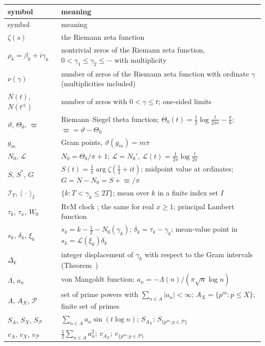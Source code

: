 \documentclass[preprint,12pt]{elsarticle}
\makeatletter
\let\CG@origref\ref
\let\CG@origeqref\eqref
\newcommand{\CG@gettip}[1]{\@ifundefined{CGTip@#1}{Reference: #1}{\csname CGTip@#1\endcsname}}
\DeclareRobustCommand{\CGref}[1]{\pdftooltip{\CG@origref{#1}}{\CG@gettip{#1}}}
\DeclareRobustCommand{\CGeqref}[1]{\pdftooltip{\CG@origeqref{#1}}{\CG@gettip{#1}}}
\numberwithin{equation}{section}
\theoremstyle{plain}
\theoremstyle{definition}
\theoremstyle{remark}
\newcommand{\NO}{N_0}
\newcommand{\lL}{\mathcal L}
\newcommand{\IT}{\mathcal I_T}
\newcommand{\PP}{\mathcal P}
\makeatother
\begin{document}
\begin{center}
\small
\begin{longtable}{p{}p{}}
\toprule
symbol & meaning\\
\midrule
\endfirsthead
\toprule
symbol & meaning\\
\midrule
\endhead
\bottomrule
\endfoot
$\zeta(s)$ & the Riemann zeta function\\
$\rho_k=\beta_k+i\gamma_k$ & nontrivial zeros of the Riemann zeta function, $0<\gamma_1\le\gamma_2\le\cdots$ with multiplicity\\
$\nu(\gamma)$ & number of zeros of the Riemann zeta function with ordinate $\gamma$ (multiplicities included)\\
$N(t)$, $N(t^\pm)$ & number of zeros with $0<\gamma\le t$; one-sided limits\\
$\vartheta$, $\Theta_0$, $\varpi$ & Riemann--Siegel theta function; $\Theta_0(t)=\frac t2\log\frac t{2\pi e}-\frac\pi8$; $\varpi=\vartheta-\Theta_0$\\
$g_m$ & Gram points, $\vartheta(g_m)=m\pi$\\
$\NO$, $\lL$ & $\NO=\Theta_0/\pi+1$; $\lL=\NO'$, $\lL(t)=\frac1{2\pi}\log\frac t{2\pi}$\\
$S$, $S^*$, $G$ & $S(t)=\frac1\pi\arg\zeta(\frac12+it)$; midpoint value at ordinates; $G=N-\NO=S+\varpi/\pi$\\
$\IT$, $\langle\,\cdot\,\rangle_I$ & $\{k:T<\gamma_k\le2T\}$; mean over $k$ in a finite index set $I$\\
$\tau_k$, $\tau_x$, $W_0$ & RvM clock \CGeqref{eq:clock}; the same for real $x\ge1$; principal Lambert function\\
$s_k$, $\delta_k$, $\xi_k$ & $s_k=k-\frac12-\NO(\gamma_k)$; $\delta_k=\tau_k-\gamma_k$; mean-value point in $s_k=\lL(\xi_k)\delta_k$\\
$\Delta_k$ & integer displacement of $\gamma_k$ with respect to the Gram intervals (Theorem~\CGref{thm:known_korolev})\\
$\Lambda$, $a_n$ & von Mangoldt function; $a_n=-\Lambda(n)/(\pi\sqrt n\log n)$\\
$A$, $A_X$, $\PP$ & set of prime powers with $\sum_{n\in A}|a_n|<\infty$; $A_X=\{p^m:p\le X\}$; finite set of primes\\
$S_A$, $S_X$, $S_\PP$ & $\sum_{n\in A}a_n\sin(t\log n)$; $S_{A_X}$; $S_{\{p^m:p\in\PP\}}$\\
$v_A$, $v_X$, $v_\PP$ & $\frac12\sum_{n\in A}a_n^2$; $v_{A_X}$; $v_{\{p^m:p\in\PP\}}$\\

\end{longtable}
\end{center}
\end{document}
